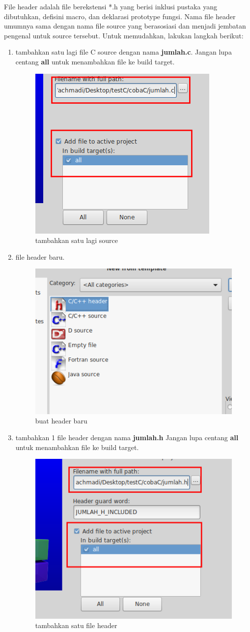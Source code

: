\documentclass[12pt,]{article}
\begin{document}
	File header adalah file berekstensi *.h yang berisi inklusi pustaka yang dibutuhkan, defisini macro, dan deklarasi prototype fungsi.
	Nama file header umumnya sama dengan nama file source yang berasosiasi dan menjadi jembatan pengenal untuk source tersebut.
	Untuk memudahkan, lakukan langkah berikut:
	\begin{enumerate}
		\item tambahkan satu lagi file C source dengan nama \textbf{jumlah.c}.
		Jangan lupa centang \textbf{all} untuk menambahkan file ke build target.
		\begin{figure}[H]
			\centering
			\includegraphics[width=0.35\linewidth]{images/c_mul_0}
			\caption{tambahkan satu lagi source}
		\end{figure}

		\item file header baru.
		\begin{figure}[H]
			\centering
			\includegraphics[width=0.35\linewidth]{images/c_mul_1}
			\caption{buat header baru}
		\end{figure}

		\item tambahkan 1 file header dengan nama \textbf{jumlah.h}
		Jangan lupa centang \textbf{all} untuk menambahkan file ke build target.
		\begin{figure}[H]
			\centering
			\includegraphics[width=0.35\linewidth]{images/c_mul_2}
			\caption{tambahkan satu file header}
		\end{figure}


\end{enumerate}
\end{document}
